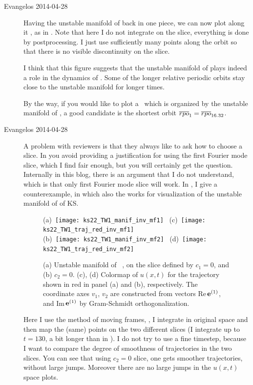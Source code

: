 \begin{description}
\item[Evangelos 2014-04-28] Having the unstable manifold of  back in one piece,
we can now plot along it , as in .
Note that here I do not integrate on the slice, everything is done
by postprocessing. I just use sufficiently many points along the orbit so that there is
no visible discontinuity on the slice.

I think that this figure suggests that the unstable manifold of 
plays indeed a role in the dynamics of . Some of the longer
relative periodic orbits stay close to the unstable manifold for longer
times.

By the way, if you would like to plot a \rpo\ which is organized by the unstable manifold of ,
a good candidate is the shortest orbit $\RPO{1}=\RPO{16.32}$.

\item[Evangelos 2014-04-28] A problem with reviewers is that they always like to ask
how to choose a slice. In  you avoid providing a justification
for using the first Fourier mode slice, which I find fair enough, but you will certainly get
the question. Internally in this blog, there is an argument that I do not understand,
which is that only first Fourier mode slice will work. In , I give a
counterexample, in which also the {\sFslice} works for visualization of
the unstable manifold of  of KS.

\begin{figure}
\begin{center}
(a)~\texttt{[image: ks22\_TW1\_manif\_inv\_mf1]}~
(c)~\texttt{[image: ks22\_TW1\_traj\_red\_inv\_mf1]}\\
(b)~\texttt{[image: ks22\_TW1\_manif\_inv\_mf2]}~
(d)~\texttt{[image: ks22\_TW1\_traj\_red\_inv\_mf2]}
\end{center}
\caption{
(a) Unstable manifold of \reqv\ , on the slice defined by $c_1=0$,
and (b) $c_2=0$. (c), (d) Colormap of $u(x,t)$ for the trajectory shown in
red in panel (a) and (b), respectively.
The coordinate axes $v_1$, $v_2$ are constructed from vectors Re\,$\jEigvec[1]$,
and Im\,$\jEigvec[1]$ by Gram-Schmidt
orthogonalization.
       }
\label{f:KS22TW1_manif_mf}
\end{figure}

Here I use the method of moving frames, \ie, I integrate in original space and then
map the (same) points on the two different slices (I integrate up to $t=130$, a bit
longer than in ).
I do not try to use a fine timestep, because I want to
compare the degree of smoothness of trajectories in the two slices.
You can see that using $c_2=0$ slice, one gets smoother trajectories, without large
jumps. Moreover there are no large jumps in the $u(x,t)$ space plots.


\end{description}

